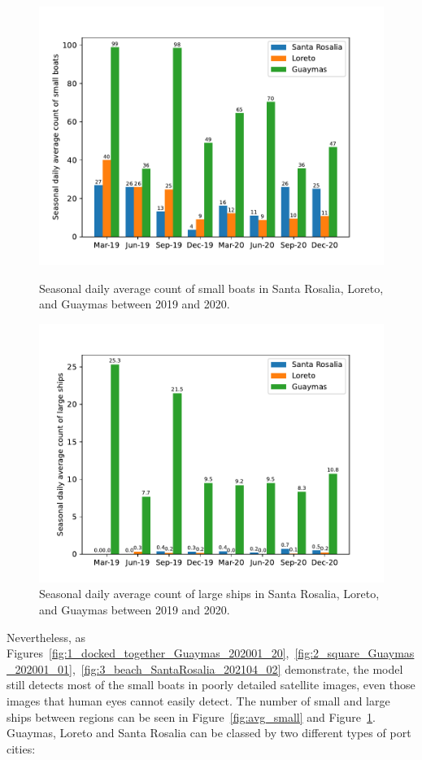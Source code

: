\begin{figure}[t]
    \center
    \includegraphics[width=\columnwidth]{img/avg_small.pdf}
    \caption{Seasonal daily average count of small boats in Santa Rosalia, Loreto, and Guaymas between 2019 and 2020.}
    \label{fig:avg_small}

    \center
    \includegraphics[width=\columnwidth]{img/avg_big.pdf}
    \caption{Seasonal daily average count of large ships in Santa Rosalia, Loreto, and Guaymas between 2019 and 2020.}
    \label{fig:avg_big}
\end{figure}

Nevertheless, as Figures~\ref{fig:1_docked_together_Guaymas_202001_20},~\ref{fig:2_square_Guaymas_202001_01},~\ref{fig:3_beach_SantaRosalia_202104_02} demonstrate, the model still detects most of the small boats in poorly detailed satellite images, even those images that human eyes cannot easily detect. The number of small and large ships between regions can be seen in Figure~\ref{fig:avg_small} and Figure~\ref{fig:avg_big}. Guaymas, Loreto and Santa Rosalia can be classed by two different types of port cities:

